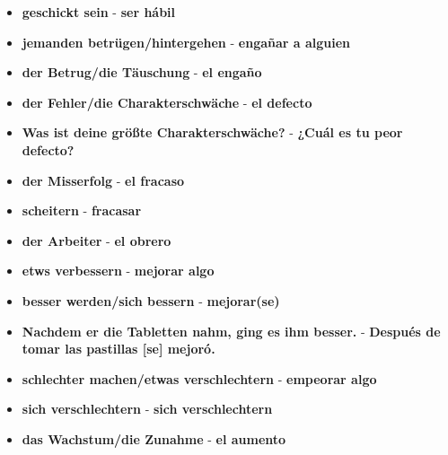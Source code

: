 \documentclass{article}
\begin{document}
\begin{multicols}{2}
\begin{itemize}
		\item{\textbf{geschickt sein} - \textbf{ser hábil}}
		\item{\textbf{jemanden betrügen/hintergehen} - \textbf{engañar a alguien}}
		\item{\textbf{der Betrug/die Täuschung} - \textbf{el engaño}}
		\item{\textbf{der Fehler/die Charakterschwäche} - \textbf{el defecto}}
		\item{\textbf{Was ist deine größte Charakterschwäche?} - \textbf{¿Cuál es tu peor defecto?}}
		\item{\textbf{der Misserfolg} - \textbf{el fracaso}}
		\item{\textbf{scheitern} - \textbf{fracasar}}
		\item{\textbf{der Arbeiter} - \textbf{el obrero}}
		\item{\textbf{etws verbessern} - \textbf{mejorar algo}}
		\item{\textbf{besser werden/sich bessern} - \textbf{mejorar(se)}}
		\item{\textbf{Nachdem er die Tabletten nahm, ging es ihm besser.} - \textbf{Después de tomar las pastillas [se] mejoró.}}
		\item{\textbf{schlechter machen/etwas verschlechtern} - \textbf{empeorar algo}}
		\item{\textbf{sich verschlechtern} - \textbf{sich verschlechtern}}
		\item{\textbf{das Wachstum/die Zunahme} - \textbf{el aumento}}
	\end{itemize}
	\end{multicols}
	
\end{document}
